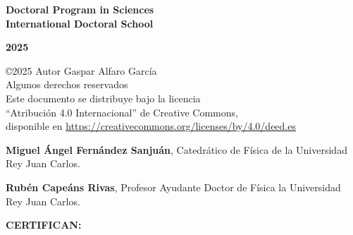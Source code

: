 \documentclass[a4paper,12pt,nofootinbib]{newsiambook}
\newcommand{\clearemptydoublepage}{\newpage{\pagestyle{empty}\cleardoublepage}}
\begin{document}
\begin{center}
\vspace*{1cm}

\begin{center}
	{\bf Doctoral Program in Sciences\\
		International Doctoral School}
\end{center} 

\vspace*{0.5cm}

\begin{center}
	{\bf \Large 2025}
\end{center}                         %

\end{center}

\clearemptydoublepage \frontmatter








\thispagestyle{empty}
\mbox{}
\vfill
\noindent
©2025 Autor Gaspar Alfaro García\\
Algunos derechos reservados\\
Este documento se distribuye bajo la licencia\\
“Atribución 4.0 Internacional” de Creative Commons,\\
disponible en \url{https://creativecommons.org/licenses/by/4.0/deed.es}




\thispagestyle{empty}






\clearemptydoublepage


\noindent
\textbf{Miguel Ángel Fernández Sanjuán}, Catedrático de Física de la Universidad Rey Juan Carlos. 

\vspace*{0.5cm}

\noindent
\textbf{Rubén Capeáns Rivas}, Profesor Ayudante Doctor de Física la Universidad Rey Juan Carlos.


\vspace*{1.5cm}

\textbf{CERTIFICAN:}

\vspace*{1.5cm}
\end{document}
